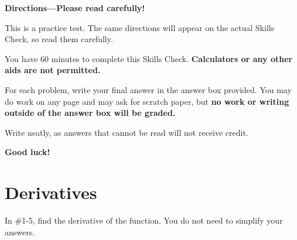 \documentclass{article}
\begin{document}


{\Large
\begin{center}\textbf{Directions---Please read carefully!} \end{center}}

This is a practice test. The same directions will appear on the actual Skills Check, so read them carefully.

\hrulefill 

You have 60 minutes to complete this Skills Check. \textbf{Calculators or any other aids are not permitted.}  


For each problem, write your final answer in the answer box provided. You may do work on any page and may ask for scratch paper, but \textbf{no work or writing outside of the answer box will be graded.}

Write neatly, as answers that cannot be read will not receive credit. 

   

\begin{center}\textbf{Good luck!}\end{center}


\newpage


\section*{Derivatives}



\noindent In \#1-5, find the derivative of the function. You do not need to simplify your answers.
\end{document}
